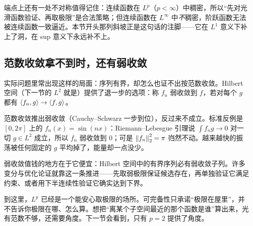 端点上还有一处不对称值得记住：连续函数在 \(L^p\)（\(p<\infty\)）中稠密，所以``先对光滑函数验证、再取极限''是合法策略；但连续函数在 \(L^\infty\) 中\emph{不}稠密，阶跃函数无法被连续函数一致逼近。本节开头那列斜坡正是这句话的注脚——它在 \(L^1\) 意义下补上了洞，在 sup 意义下永远补不上。

\subsection{范数收敛拿不到时，还有弱收敛}

实际问题里常出现这样的局面：序列有界，却怎么也证不出按范数收敛。Hilbert 空间（下一节的 \(L^2\) 就是）提供了退一步的选项：称 \(f_n\) 弱收敛到 \(f\)，若对每个 \(g\) 都有 \(\left\langle f_n,g\right\rangle\to\left\langle f,g\right\rangle\)。

范数收敛推出弱收敛（Cauchy--Schwarz 一步到位），反过来不成立。标准反例是 \([0,2\pi]\) 上的 \(f_n(x)=\sin(nx)\)：Riemann--Lebesgue 引理说 \(\int f_n g\to0\) 对一切 \(g\in L^2\) 成立，所以 \(f_n\) 弱收敛到 \(0\)；可是 \(\left\lVert f_n\right\rVert_2^2=\pi\) 岿然不动。越来越快的振荡被任何固定的 \(g\) 平均掉了，能量却一点没少。

弱收敛值钱的地方在于它便宜：Hilbert 空间中的有界序列必有弱收敛子列。许多变分与优化论证就靠这一条推进——先取弱极限保证候选存在，再单独验证它满足约束、或者用下半连续性验证它确实达到下界。

到这里，\(L^p\) 已经是一个能安心取极限的场所。可完备性只承诺``极限在屋里''，并不告诉你极限在哪、怎么算。想把``离某个子空间最近的那个函数是谁''算出来，光有范数不够，还需要角度。下一节会看到，只有 \(p=2\) 提供了角度。
